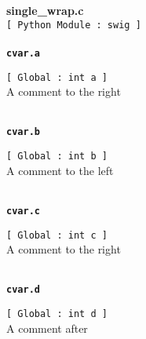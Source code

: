 \setlength{\parindent}{0.0in}
\setlength{\textwidth}{6.5in}
\setlength{\oddsidemargin}{0.0in}
\pagestyle{headings}

{\Large \bf  single\_wrap.c }\\
{\tt [ Python Module : swig ]  }\\
\\{\tt \bf cvar.a }
\\
\makebox[0.5in]{}\begin{minipage}[t]{6in}
{\tt [ Global : int  a ]  }\\
   A comment to the right   
\\

\end{minipage}\\

{\tt \bf cvar.b }
\\
\makebox[0.5in]{}\begin{minipage}[t]{6in}
{\tt [ Global : int  b ]  }\\
   A comment to the left   
\\

\end{minipage}\\

{\tt \bf cvar.c }
\\
\makebox[0.5in]{}\begin{minipage}[t]{6in}
{\tt [ Global : int  c ]  }\\
   A comment to the right   
\\

\end{minipage}\\

{\tt \bf cvar.d }
\\
\makebox[0.5in]{}\begin{minipage}[t]{6in}
{\tt [ Global : int  d ]  }\\
   A comment after   
\\

\end{minipage}\\



